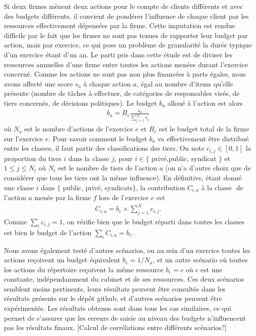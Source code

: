 \documentclass[a4paper,12pt]{article}
\begin{document}
Si deux firmes mènent deux actions pour le compte de clients différents et avec des budgets différents, il convient de pondérer l’influence de chaque client par les ressources effectivement dépensées par la firme. Cette imputation est rendue difficile par le fait que les firmes ne sont pas tenues de rapporter leur budget par action, mais par exercice,  ce qui pose un problème de granularité la durée typique d'un exercice étant d'un an. Le parti pris dans cette étude est de diviser les ressources annuelles d’une firme entre toutes les actions menées durant l’exercice concerné. Comme les actions ne sont pas non plus financées à parts égales, nous avons affecté une score $ s_{a}$ à chaque action $ a$, égal au nombre d’items qu'elle présente (nombre de t\^aches à effectuer, de catégories de responsables visés, de tiers concernés, de décisions politiques). Le budget $ b_{a}$ alloué à l'action est alors
\begin{align*}b_{a} =B_{e} \frac{s_{a}}{\sum_{j = 1}^{N_{a}}s_{j}}
\end{align*}
où $ N_{a}$ est le nombre d'actions de l'exercice $ e$ et $ B_{e}$ est le budget total de la firme sur l'exercice $ e.$
Pour savoir comment le budget $ b_{a}$   va effectivement \^etre distribué entre les classes, il faut partir des classifications des tiers. On note $ c_{{i,j}}\in [0,1]$ la proportion du tiers $ i$ dans la classe $ j$, pour $ i\in \{\textrm{ privé,public, syndicat }\}$ et $ 1\leqslant j\leqslant N_{t}$ où $ N_{t}$ est le nombre de tiers de l'action $ a$ (on n'a d'autre choix que de considérer que tous les tiers ont la m\^eme influence).
En définitive, étant donné une classe $ i$ dans $ \{$  public, privé, syndicats$\}$, la contribution $ C_{i,a}$ à la classe $ $ de l'action  $ a$ menée par la firme $ f$ lors de l'exercice $ e$ est 
\begin{align*}
C_{i,a} =b_{e}\times \sum_{j = 1}^{N}{ c_{i,j}}.
\end{align*}
Comme $ \sum_{i}c_{i,j} = 1$, on vérifie bien que le budget réparti dans toutes les classes est bien le budget de l'action $ \sum_{i}C_{i,a} = b_{e}$.

Nous avons également testé d’autres scénarios, ou au sein d’un exercice toutes les actions reçoivent un budget équivalent $ b_{e} = 1/N_{a}$, et un autre scénario où toutes les actions du répertoire reçoivent la même ressource $ b_{e} = c$ où $ c$ est une constante, indépendamment du cabinet et de ses ressources. Ces deux scénarios semblent moins pertinents, leurs résultats peuvent \^etre consultés dans les résultats présents sur le  dép\^ot github, et d'autres scénarios peuvent \^etre expérimentés.  Les résultats obtenus sont dans tous les cas similaires, ce qui permet de s'assurer que les erreurs de saisie au niveau des budgets n'influencent pas les résultats finaux.  [Calcul de corrélations entre différents scénarios?]
\end{document}
